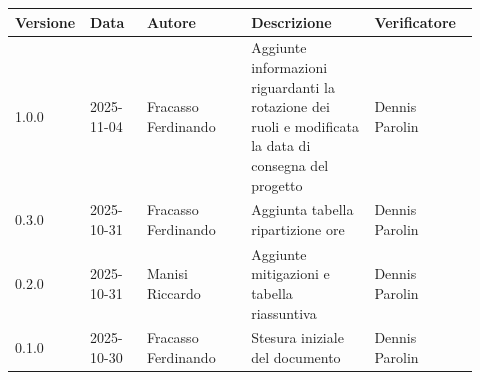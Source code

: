 \documentclass[a4paper,12pt]{article}
\begin{document}
\begin{center}
\small
\renewcommand{\arraystretch}{1.2} 
\begin{tabular}{|p{0.1\linewidth}|p{0.12\linewidth}|p{0.22\linewidth}|p{0.26\linewidth}|p{0.22\linewidth}|}
\hline
\rowcolor{gray!60} 
\textbf{Versione} & \textbf{Data} & \textbf{Autore} & \textbf{Descrizione} & \textbf{Verificatore} \\
\hline
\rowcolor{white}
1.0.0 & 2025-11-04 & Fracasso Ferdinando & Aggiunte informazioni riguardanti la rotazione dei ruoli e modificata la data di consegna del progetto & Dennis Parolin \\
\hline
\rowcolor{gray!20}
0.3.0 & 2025-10-31 & Fracasso Ferdinando & Aggiunta tabella ripartizione ore & Dennis Parolin \\
\hline
\rowcolor{white}
0.2.0 & 2025-10-31 & Manisi Riccardo & Aggiunte mitigazioni e tabella riassuntiva & Dennis Parolin \\
\hline
\rowcolor{gray!20}
0.1.0 & 2025-10-30 & Fracasso Ferdinando & Stesura iniziale del documento & Dennis Parolin \\
\hline
\end{tabular}
\end{center}
\end{document}
